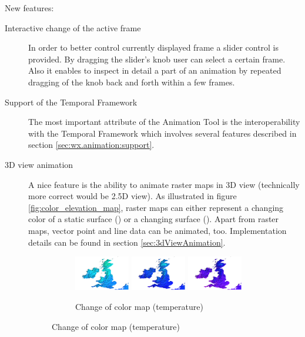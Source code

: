 \documentclass[a4paper,12pt,oneside]{book}
\newcommand{\tf}{Temporal Framework\xspace}
\newcommand{\at}{Animation Tool\xspace}
\begin{document}
\noindent New features:
\begin{description}
    \item[Interactive change of the active frame]
    In order to better control currently displayed frame a slider control is provided.
    By dragging the slider's knob user can select a certain frame.
    Also it enables to inspect in detail a part of an animation
    by repeated dragging of the knob back and forth within a few frames.

    \item[Support of the \tf]
    The most important attribute of the \at is the interoperability with the \tf
    which involves several features described in section \ref{sec:wx.animation:support}.

    \item[3D view animation]
    A nice feature is the ability to animate raster maps in 3D view (technically more correct would be 2.5D view).
    As illustrated in figure \ref{fig:color_elevation_map},
    raster maps can either represent a changing color of a static surface () or
    a changing surface ().
    Apart from raster maps, vector point and line data can be animated, too.
    Implementation details can be found in section \ref{sec:3dViewAnimation}.

    \begin{figure}[ht]
    \centering
        \begin{subfigure}[h]{\textwidth}
        \centering
        \includegraphics[width=0.3\textwidth]{./images/color_map1.png}
        \includegraphics[width=0.3\textwidth]{./images/color_map2.png}
        \includegraphics[width=0.3\textwidth]{./images/color_map3.png}
        \caption{Change of color map (temperature)}
        \label{fig:color_map}
        \end{subfigure}


\end{figure}
\end{description}
\end{document}
